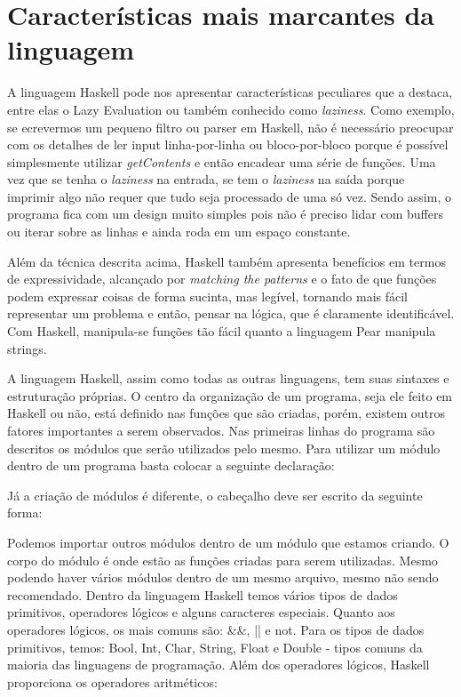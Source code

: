 \chapter{Características mais marcantes da linguagem}

    A linguagem Haskell pode nos apresentar características peculiares que a destaca, entre elas o Lazy Evaluation ou também conhecido como \emph{laziness}. Como exemplo,
    se ecrevermos um pequeno filtro ou parser em Haskell, não é necessário preocupar com os detalhes de ler input linha-por-linha ou bloco-por-bloco porque é possível
    simplesmente utilizar \emph{getContents} e então encadear uma série de funções. Uma vez que se tenha o \emph{laziness} na entrada, se tem o \emph{laziness} na saída porque imprimir
    algo não requer que tudo seja processado de uma só vez. Sendo assim, o programa fica com um design muito simples pois não é preciso lidar com buffers ou iterar sobre
    as linhas e ainda roda em um espaço constante.

    Além da técnica descrita acima, Haskell também apresenta benefícios em termos de expressividade, alcançado por \emph{matching the patterns} e o fato de que funções podem
    expressar coisas de forma sucinta, mas legível, tornando mais fácil representar um problema e então, pensar na lógica, que é claramente identificável. Com Haskell,
    manipula-se funções tão fácil quanto a linguagem Pear manipula strings.

    A linguagem Haskell, assim como todas as outras linguagens, tem suas sintaxes e estruturação próprias. O centro da organização de um programa, seja ele feito em Haskell ou não,
    está definido nas funções que são criadas, porém, existem outros fatores importantes a serem observados.
    Nas primeiras linhas do programa são descritos os módulos que serão utilizados pelo mesmo. Para utilizar um módulo dentro de um programa basta colocar a seguinte declaração:

    Já a criação de módulos é diferente, o cabeçalho deve ser escrito da seguinte forma:

    \newpage 

    Podemos importar outros módulos dentro de um módulo que estamos criando. O corpo do módulo é onde estão as funções criadas para serem utilizadas. Mesmo podendo haver vários módulos
    dentro de um mesmo arquivo, mesmo não sendo recomendado.
    Dentro da linguagem Haskell temos vários tipos de dados primitivos, operadores lógicos e alguns caracteres especiais. Quanto aos operadores lógicos, os mais comuns são:
    \&\&, || e not. Para os tipos de dados primitivos, temos: Bool, Int, Char, String, Float e Double - tipos comuns da maioria das linguagens de programação. 
    Além dos operadores lógicos, Haskell proporciona os operadores aritméticos:

